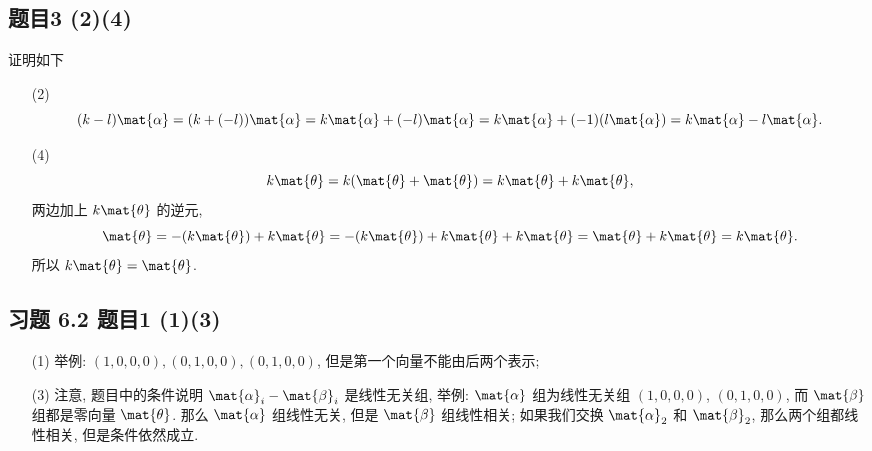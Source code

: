 \subsection*{ 题目3 (2)(4) }
\begin{solution} 证明如下
\begin{enumerate}
    \item[(2)]
    \[
    (k - l)\mat{\alpha} = (k + (-l))\mat{\alpha} = k\mat{\alpha} + (-l)\mat{\alpha} = k\mat{\alpha} + (-1)(l\mat{\alpha}) = k\mat{\alpha} - l\mat{\alpha}.
    \]
    \item[(4)]
    \[
    k\mat{\theta} = k(\mat{\theta} + \mat{\theta}) = k\mat{\theta} + k\mat{\theta},
    \]
    两边加上 $k\mat{\theta}$ 的逆元,
    \[
    \mat{\theta} = -(k\mat{\theta}) + k\mat{\theta} = -(k\mat{\theta}) + k\mat{\theta} + k\mat{\theta} = \mat{\theta} + k\mat{\theta} = k\mat{\theta}.
    \]
    所以 $k\mat{\theta} = \mat{\theta}$.
\end{enumerate}
\end{solution}

\subsection*{ 习题 6.2 题目1 (1)(3) }
\begin{solution}
\begin{enumerate}
    \item[(1)] 举例: $(1, 0, 0, 0), (0, 1, 0, 0), (0, 1, 0, 0)$, 但是第一个向量不能由后两个表示;
    \item[(3)] 注意, 题目中的条件说明 $\mat{\alpha}_i - \mat{\beta}_i$ 是线性无关组, 举例: $\mat{\alpha}$ 组为线性无关组 $(1, 0, 0, 0)$, $(0, 1, 0, 0)$, 而 $\mat{\beta}$ 组都是零向量 $\mat{\theta}$. 那么 $\mat{\alpha}$ 组线性无关, 但是 $\mat{\beta}$ 组线性相关; 如果我们交换 $\mat{\alpha}_2$ 和 $\mat{\beta}_2$, 那么两个组都线性相关, 但是条件依然成立.
\end{enumerate}
\end{solution}

